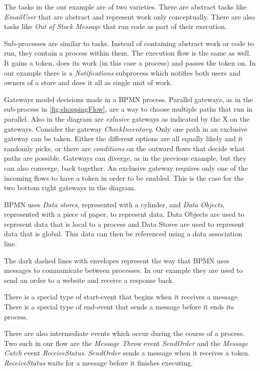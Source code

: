 \documentclass[11pt,twocolumn]{article}
\begin{document}
The tasks in the our example are of two varieties. There are abstract tasks like \emph{EmailUser} that are abstract and represent work only conceptually. There are also tasks like \emph{Out of Stock Message} that run code as part of their execution.

Sub-processes are similar to tasks. Instead of containing abstract work or code to run, they contain a process within them. The execution flow is the same as well. It gains a token, does its work (in this case a process) and passes the token on. In our example there is a \emph{Notifications} subprocess which notifies both users and owners of a store and does it all as single unit of work.

Gateways model decisions made in a BPMN process. Parallel gateways, as in the sub-process in \ref{fig:shoppingFlow}, are a way to choose multiple paths that run in parallel. Also in the diagram are \emph{exlusive} gateways as indicated by the X on the gateways. Consider the gateway \emph{CheckInventory}. Only one path in an exclusive gateway can be taken.  Either the different options are all equally likely and it randomly picks, or there are \emph{conditions} on the outward flows that decide what paths are possible. 
Gateways can diverge, as in the previous example, but they can also converge, back together. An exclusive gateway requires only one of the incoming flows to have a token in order to be enabled. This is the case for the two bottom right gateways in the diagram. 

BPMN uses \emph{Data stores}, represented with a cylinder, and \emph{Data Objects}, represented with a piece of paper,  to represent data. Data Objects are used to represent data that is local to a process and Data Stores are used to represent data that is global. This data can then be referenced using a data association line. 

The dark dashed lines with envelopes represent the way that BPMN uses messages to communicate between processes. In our example they are used to send an order to a website and receive a response back.

There is a special type of start-event that begins when it receives a message. There is a special type of end-event that sends a message before it ends its process.

There are also intermediate events which occur during the course of a process. Two such in our flow are the \emph{Message Throw} event \emph{SendOrder} and the \emph{Message Catch} event \emph{ReceiveStatus}. \emph{SendOrder} sends a message when it receives a token. \emph{ReceiveStatus} waits for a message before it finishes executing. 
\end{document}
